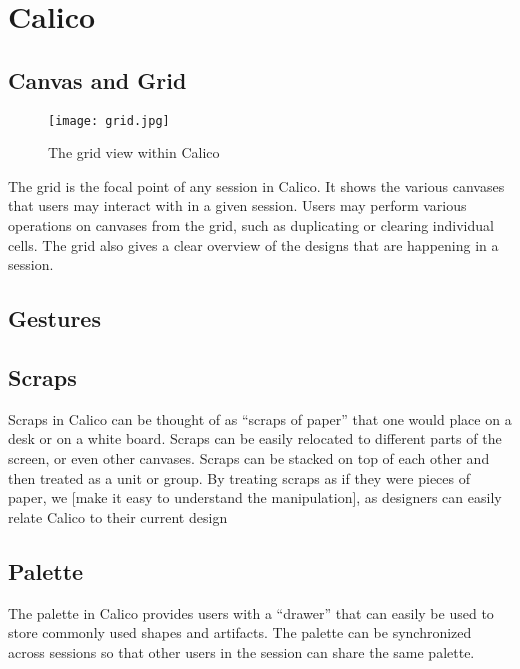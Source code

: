 \chapter{Calico}


\section{Canvas and Grid}

\begin{figure}[htb]
\centering
\texttt{[image: grid.jpg]}
\caption{The grid view within Calico}
\label{fig:grid}
\end{figure}
The grid is the focal point of any session in Calico. It shows the various canvases that users may interact with in a given session. Users may perform various operations on canvases from the grid, such as duplicating or clearing individual cells. The grid also gives a clear overview of the designs that are happening in a session.

\section{Gestures}

\section{Scraps}
Scraps in Calico can be thought of as ``scraps of paper'' that one would place on a desk or on a white board.
Scraps can be easily relocated to different parts of the screen, or even other canvases.
Scraps can be stacked on top of each other and then treated as a unit or group.
By treating scraps as if they were pieces of paper, we [make it easy to understand the manipulation], as designers can easily relate Calico to their current design 

\section{Palette}
The palette in Calico provides users with a ``drawer'' that can easily be used to store commonly used shapes and artifacts. The palette can be synchronized across sessions so that other users in the session can share the same palette.